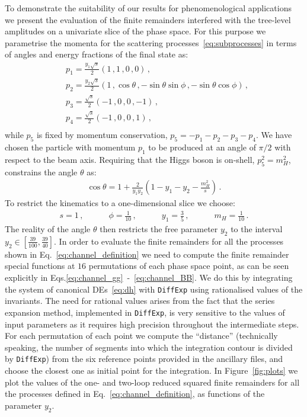 \documentclass[main.tex]{subfiles}
\begin{document}
To demonstrate the suitability of our results for phenomenological applications we present the evaluation of the finite remainders interfered with the tree-level amplitudes on a univariate slice of the phase space. For this purpose we parametrise the momenta for the scattering processes~\ref{eq:subprocesses} in terms of angles and energy fractions of the final state as:
\begin{equation} \label{eq:parametrisation}
\begin{aligned}
& p_1 = \frac{y_1 \sqrt{s}}{2} \left( 1\,, 1\,, 0\,, 0 \right) \,, \quad \\
& p_2 = \frac{y_2 \sqrt{s}}{2} \left( 1\,, \cos\theta\,, -\sin\theta \sin\phi \,, -\sin\theta \cos\phi \right) \,,  \\
& p_3 = \frac{\sqrt{s}}{2} \left(-1\,,0\,, 0 \,, -1 \right) \,,  \\
& p_4 = \frac{\sqrt{s}}{2} \left(-1\,,0\,, 0 \,, 1 \right) \,,  \\
\end{aligned}
\end{equation}
while $p_5$ is fixed by momentum conservation, $p_5 = -p_1-p_2-p_3-p_4$. We have chosen the particle with momentum $p_1$ to be produced at an angle of $\pi/2$ with respect to the beam axis.
Requiring that the Higgs boson is on-shell, $p_5^2 = m_H^2$, constrains the angle $\theta$ as:
\begin{align}
\cos\theta = 1+\frac{2}{y_1 y_2}\left(1-y_1-y_2-\frac{m_H^2}{s} \right)\,.
\end{align}
To restrict the kinematics to a one-dimensional slice we choose:
\begin{align} \label{eq:fixparameters}
s = 1 \,, \quad \qquad \phi = \frac{1}{10} \,, \quad \qquad y_1 = \frac{3}{5} \,, \quad \qquad m_H = \frac{1}{10} \,.
\end{align}
The reality of the angle $\theta$ then restricts the free parameter $y_2$ to the interval $y_2 \in
[\frac{39}{100},\frac{39}{40}]$. In order to evaluate the finite remainders for all the processes
shown in Eq.~\ref{eq:channel_definition} we need to compute the finite remainder special functions
at $16$ permutations of each phase space point, as can be seen explicitly in
Eqs.\ref{eq:channel_gg}~-~\ref{eq:channel_BB}. We do this by integrating the system of canonical DEs~\ref{eq:dh} with \texttt{DiffExp} using rationalised values of the invariants. The need for rational values arises from the fact that the series expansion method, implemented in \texttt{DiffExp}, is very sensitive to the values of input parameters as it requires high precision throughout the intermediate steps. For each permutation of each point we compute the ``distance'' (technically speaking, the number of segments into which the integration contour is divided by \texttt{DiffExp}) from the six reference points provided in the ancillary files, and choose the closest one as initial point for the integration. In Figure~\ref{fig:plots} we plot the values of the one- and two-loop reduced squared finite remainders for all the processes defined in Eq.~\ref{eq:channel_definition}, as functions of the parameter $y_2$.
\end{document}
